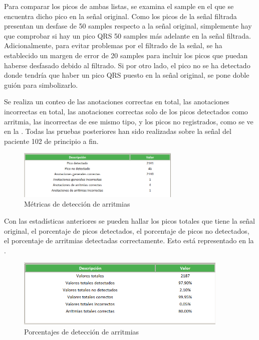 Para comparar los picos de ambas listas, se examina el sample en el que se encuentra dicho pico en la señal original. Como los picos de la señal filtrada presentan un desfase de 50 samples respecto a la señal original, simplemente hay que comprobar si hay un pico QRS 50 samples más adelante en la señal filtrada. Adicionalmente, para evitar problemas por el filtrado de la señal, se ha establecido un margen de error de 20 samples para incluir los picos que puedan haberse desfasado debido al filtrado. Si por otro lado, el pico no se ha detectado donde tendría que haber un pico QRS puesto en la señal original, 
se pone doble guión para simbolizarlo. 

Se realiza un conteo de las anotaciones correctas en total, las anotaciones incorrectas en total, las anotaciones
correctas solo de los picos detectados como arritmia, las incorrectas de ese mismo tipo, y los picos no registrados, 
como se ve en la . Todas las pruebas posteriores han sido realizadas sobre la señal del paciente 102 de principio a fin.

\begin{figure}[h!]
	\centering
    \includegraphics[width=0.69\textwidth]{./Images/img_algoritmo/estadisticassacadastabla.png}
    \caption{Métricas de detección de arritmias}
    \label{fig:estadisticassacadastabla}
\end{figure} 
\newpage

Con las estadísticas anteriores se pueden hallar los picos totales que tiene la señal original, el porcentaje de picos 
detectados, el porcentaje de picos no detectados, el porcentaje de arritmias detectadas 
correctamente. Esto está representado en la .

\begin{figure}[h!]
	\centering
    \includegraphics[width=0.9\textwidth]{./Images/img_algoritmo/estadisticasporcentaje.png}
    \caption{Porcentajes de detección de arritmias}
    \label{fig:estadisticasporcentaje}
\end{figure} 


